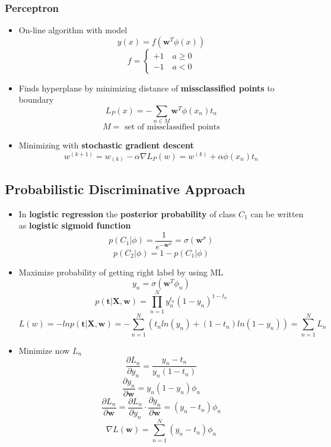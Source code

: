 \documentclass[12pt]{article} %
\begin{document}
\subsubsection{Perceptron}
\begin{itemize}
\item On-line algorithm with model
$$ y(x) = f(\bm{w}^T \phi(x))$$
$$ f = \begin{cases}
+1 \quad a \geq 0\\
-1 \quad a < 0
\end{cases}
$$
\item Finds hyperplane by minimizing distance of \textbf{missclassified points} to boundary
$$ L_P(x) = - \sum \limits_{n \in M }\bm{w}^T \phi(x_n)t_n $$
$$ M = \text{ set of missclassified points}$$

\item Minimizing with \textbf{stochastic gradient descent}
$$ w^{(k+1)} = w_{(k)}-\alpha \nabla L_P(w)= w^{(k)} + \alpha \phi(x_n)t_n$$
\end{itemize}

\subsection{Probabilistic Discriminative Approach}
\begin{itemize}
\item In \textbf{logistic regression} the \textbf{posterior probability} of class $C_1$ can be written as \textbf{logistic sigmoid function} 
$$ p(C_1|\phi) = \frac{1}{e^{-\bm{w}^\phi}} = \sigma(\bm{w}^ \sigma)$$
$$ p(C_2|\phi) = 1- p(C_1|\phi)$$

\item Maximize probability of getting right label by using ML
$$ y_n = \sigma(\bm{w}^T \phi_n)$$ 
$$ p(\bm{t}|\bm{X,w}) = \prod \limits_{n=1}^N y_n^{t_n}(1-y_n)^{1-t_n}$$
$$ L(w) = - ln p(\bm{t}|\bm{X,w})= - \sum \limits_{n=1}^N (t_n ln(y_n)+(1-t_n)ln(1-y_n))= \sum \limits_{n=1}^N  L_n $$

\item Minimize now $L_n$
$$ \frac{\partial L_n}{\partial y_n} = \frac{y_n-t_n}{y_n(1-t_n)}$$
$$ \frac{\partial y_n}{\partial \bm{w}} = y_n(1-y_n)\phi_n$$
$$ \frac{\partial L_n}{\partial \bm{w}} = \frac{\partial L_n}{\partial y_n} \cdot \frac{\partial y_n}{\partial \bm{w}} = (y_n-t_n)\phi_n$$
$$ \nabla L(\bm{w}) = \sum \limits_{n=1}^N (y_n - t_n)\phi_n$$
\end{itemize}
\end{document}
